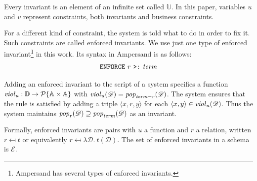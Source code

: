 \documentclass[runningheads]{llncs}
\newcommand{\id}[1]{\text{\it #1\/}}
\newcommand{\popF}[1]{\id{pop}_{#1}}
\newcommand{\pop}[2]{\popF{#1}(#2)}
\newcommand{\viol}[2]{\violC{#1}(#2)}
\newcommand{\violC}[1]{\id{viol}_{#1}}
\newcommand{\powerset}[1]{\cal{P}\{#1\}}
\newcommand{\pair}[2]{\langle{#1},{#2}\rangle}
\newcommand{\Pair}[2]{#1\times#2}
\newcommand{\triple}[3]{\langle{#1},{#2},{#3}\rangle}
\newcommand{\Atoms}{\mathbb{A}}
\newcommand{\enforces}{\mathcal{E}}
\newcommand{\Rules}{\mathbb{U}}
\newcommand{\dataset}{\mathscr{D}}
\newcommand{\Dataset}{\mathbb{D}}
\begin{document}
   Every invariant is an element of an infinite set called $\Rules$.
   In this paper, variables $u$ and $v$ represent constraints, both invariants and business constraints.
   
   For a different kind of constraint, the system is told what to do in order to fix it.
   Such constraints are called enforced invariants.
   We use just one type of enforced invariant\footnote{Ampersand has several types of enforced invariants.} in this work.
   Its syntax in Ampersand is as follows:
\begin{align}
      \text{\tt ENFORCE}\ r\ \text{\tt >:}\ \id{term}\label{enforce ins}
\end{align}

   Adding an enforced invariant to the script of a system specifies a function $\violC{u} : \Dataset \to \powerset{\Pair{\Atoms}{\Atoms}}$
   with $\viol{u}{\dataset} = \pop{\id{term} - r}{\dataset}$.
   The system ensures that the rule is satisfied by adding a triple $\triple{x}{r}{y}$ for each $\pair{x}{y} \in \viol{u}{\dataset}$.
   Thus the system maintains $\pop{r}{\dataset} \supseteq \pop{\id{term}}{\dataset}$ as an invariant.
   
   Formally, enforced invariants are pairs with $u$ a function and $r$ a relation, written $r \mapsfrom t$ or equivalently $r \mapsfrom \lambda \dataset.~ t(\dataset)$.
   The set of enforced invariants in a schema is $\enforces$.
   
\end{document}
